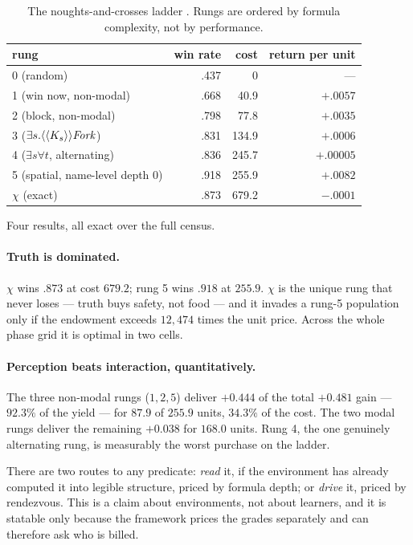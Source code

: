 \begin{table}[h]
\centering
\small
\renewcommand{\arraystretch}{1.2}
\begin{tabular}{@{}lrrr@{}}
\toprule
rung & win rate & cost & return per unit \\
\midrule
0 (random)                    & .437 & 0     & --- \\
1 (win now, non-modal)        & .668 & 40.9  & $+.0057$ \\
2 (block, non-modal)          & .798 & 77.8  & $+.0035$ \\
3 ($\exists s.\langle\langle K_{s}\rangle\rangle \mathit{Fork}$) & .831 & 134.9 & $+.0006$ \\
4 ($\exists s \forall t$, alternating)  & .836 & 245.7 & $+.00005$ \\
5 (spatial, name-level depth 0) & .918 & 255.9 & $+.0082$ \\
$\chi$ (exact)                & .873 & 679.2 & $-.0001$ \\
\bottomrule
\end{tabular}
\caption{The noughts-and-crosses ladder \cite{GameNote}. Rungs are ordered by
formula complexity, not by performance.}
\label{tab:ladder}
\end{table}

Four results, all exact over the full census.

\paragraph{Truth is dominated.} $\chi$ wins $.873$ at cost $679.2$; rung 5 wins
$.918$ at $255.9$. $\chi$ is the unique rung that never loses --- truth buys
safety, not food --- and it invades a rung-5 population only if the endowment
exceeds $12{,}474$ times the unit price. Across the whole phase grid it is optimal
in two cells.

\paragraph{Perception beats interaction, quantitatively.} The three non-modal
rungs ($1,2,5$) deliver $+0.444$ of the total $+0.481$ gain --- $92.3\%$ of the
yield --- for $87.9$ of $255.9$ units, $34.3\%$ of the cost. The two modal rungs
deliver the remaining $+0.038$ for $168.0$ units. Rung 4, the one genuinely
alternating rung, is measurably the worst purchase on the ladder.

\begin{principle}
\label{prin:readdrive}
There are two routes to any predicate: \emph{read} it, if the environment has
already computed it into legible structure, priced by formula depth; or
\emph{drive} it, priced by rendezvous. This is a claim about environments, not
about learners, and it is statable only because the framework prices the grades
separately and can therefore ask who is billed.
\end{principle}

